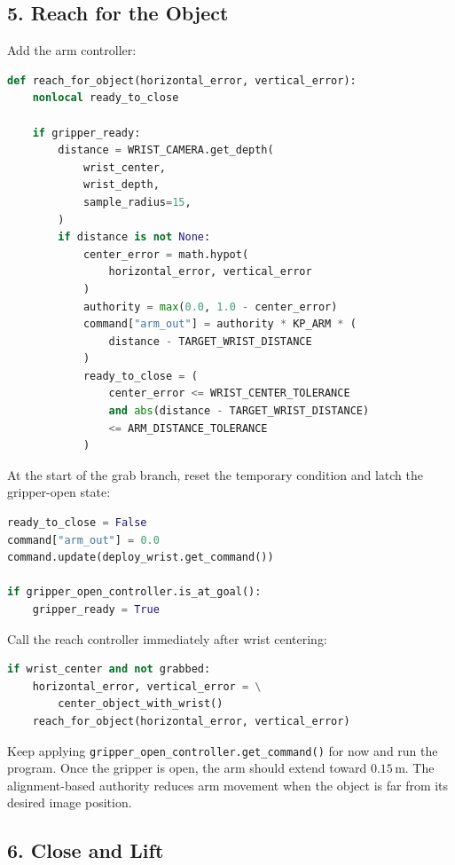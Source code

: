 \documentclass[11pt,a4paper]{article}
\begin{document}
\subsection*{5. Reach for the Object}

Add the arm controller:

\begin{lstlisting}[language=Python]
def reach_for_object(horizontal_error, vertical_error):
    nonlocal ready_to_close

    if gripper_ready:
        distance = WRIST_CAMERA.get_depth(
            wrist_center,
            wrist_depth,
            sample_radius=15,
        )
        if distance is not None:
            center_error = math.hypot(
                horizontal_error, vertical_error
            )
            authority = max(0.0, 1.0 - center_error)
            command["arm_out"] = authority * KP_ARM * (
                distance - TARGET_WRIST_DISTANCE
            )
            ready_to_close = (
                center_error <= WRIST_CENTER_TOLERANCE
                and abs(distance - TARGET_WRIST_DISTANCE)
                <= ARM_DISTANCE_TOLERANCE
            )
\end{lstlisting}

At the start of the grab branch, reset the temporary condition and latch the
gripper-open state:

\begin{lstlisting}[language=Python]
ready_to_close = False
command["arm_out"] = 0.0
command.update(deploy_wrist.get_command())

if gripper_open_controller.is_at_goal():
    gripper_ready = True
\end{lstlisting}

Call the reach controller immediately after wrist centering:

\begin{lstlisting}[language=Python]
if wrist_center and not grabbed:
    horizontal_error, vertical_error = \
        center_object_with_wrist()
    reach_for_object(horizontal_error, vertical_error)
\end{lstlisting}

Keep applying \texttt{gripper\_open\_controller.get\_command()} for now and
run the program. Once the gripper is open, the arm should extend toward
$0.15$\,m. The alignment-based authority reduces arm movement when the object
is far from its desired image position.

\subsection*{6. Close and Lift}
\end{document}
